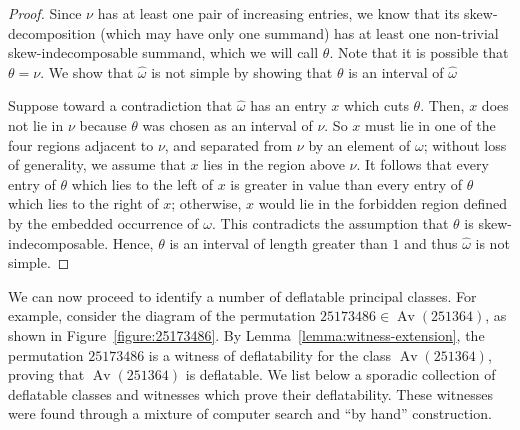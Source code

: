 \documentclass[10pt]{article}
\theoremstyle{plain}
\newcommand{\Av}{\operatorname{Av}}
\begin{document}
\begin{proof}
Since $\nu$ has at least one pair of increasing entries, we know that its skew-decomposition (which may have only one summand) has at least one non-trivial skew-indecomposable summand, which we will call $\theta$. Note that it is possible that $\theta = \nu$. We show that $\widehat{\omega}$ is not simple by showing that $\theta$ is an interval of $\widehat{\omega}$

Suppose toward a contradiction that $\widehat{\omega}$ has an entry $x$ which cuts $\theta$. Then, $x$ does not lie in $\nu$ because $\theta$ was chosen as an interval of $\nu$. So $x$ must lie in one of the four regions adjacent to $\nu$, and separated from $\nu$ by an element of $\omega$; without loss of generality, we assume that $x$ lies in the region above $\nu$. It follows that every entry of $\theta$ which lies to the left of $x$ is greater in value than every entry of $\theta$ which lies to the right of $x$; otherwise, $x$ would lie in the forbidden region defined by the embedded occurrence of $\omega$. This contradicts the assumption that $\theta$ is skew-indecomposable. Hence, $\theta$ is an interval of length greater than $1$ and thus $\widehat{\omega}$ is not simple.
\end{proof}

We can now proceed to identify a number of deflatable principal classes. For example, consider the diagram of the permutation $25173486 \in \Av(251364)$, as shown in Figure~\ref{figure:25173486}. By Lemma~\ref{lemma:witness-extension}, the permutation $25173486$ is a witness of deflatability for the class $\Av(251364)$, proving that $\Av(251364)$ is deflatable. We list below a sporadic collection of deflatable classes and witnesses which prove their deflatability. These witnesses were found through a mixture of computer search and ``by hand'' construction.
\end{document}
